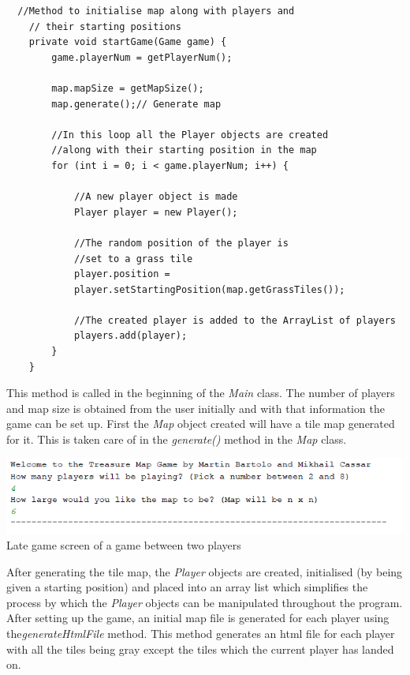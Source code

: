 \documentclass[a4paper,12pt]{extarticle}
\begin{document}
\newpage
\begin{lstlisting}
  //Method to initialise map along with players and
    // their starting positions
    private void startGame(Game game) {
        game.playerNum = getPlayerNum();

        map.mapSize = getMapSize();
        map.generate();// Generate map

        //In this loop all the Player objects are created 
        //along with their starting position in the map
        for (int i = 0; i < game.playerNum; i++) {

            //A new player object is made
            Player player = new Player();

            //The random position of the player is 
            //set to a grass tile
            player.position = 
            player.setStartingPosition(map.getGrassTiles());

            //The created player is added to the ArrayList of players
            players.add(player);
        }
    }
\end{lstlisting}
\vspace{4mm}

\noindent This method is called in the beginning of the \textit{Main} class. The number of players and map size is obtained from the user initially and with that information the game can be set up. First the \textit{Map} object created will have a tile map generated for it. This is taken care of in the \textit{generate()} method in the \textit{Map} class.\\

\begin{center}
\includegraphics[scale=0.5]{BasicMap2.png}\\
Late game screen of a game between two players
\end{center}

\noindent After generating the tile map, the \textit{Player} objects are created, initialised (by being given a starting position) and placed into an array list which simplifies the process by which the \textit{Player} objects can be manipulated throughout the program.\\

\noindent After setting up the game, an initial map file is generated for each player using the\textit{generateHtmlFile} method. This method generates an html file for each player with all the tiles being gray except the tiles which the current player has landed on.\\
\end{document}
